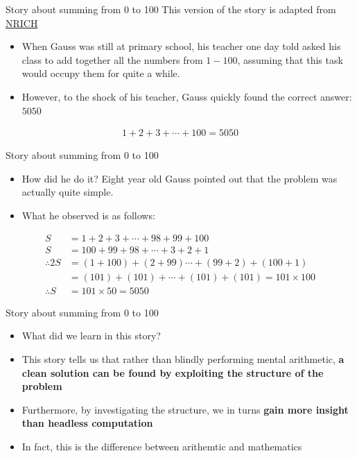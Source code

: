 \documentclass[10pt,xcolor={table,dvipsnames},t]{beamer}
\begin{document}
\begin{frame}{Story about summing from 0 to 100}
  This version of the story is adapted from \href{https://nrich.maths.org/2478}{NRICH}
  \begin{itemize}
    \item When Gauss was still at primary school, his teacher one day told asked his class to add together all the numbers from $1-100$, assuming that this task would occupy them for quite a while. 
    \item However, to the shock of his teacher, Gauss quickly found the correct answer: $5050$
  \end{itemize}
  \begin{align*}
    1 + 2 + 3 + \cdots + 100 = 5050 
  \end{align*}
\end{frame}

\begin{frame}{Story about summing from 0 to 100}
  \begin{itemize}
    \item How did he do it? Eight year old Gauss pointed out that the problem was actually quite simple.
    \item What he observed is as follows:
  \end{itemize}
  \begin{align*}
    S &= 1 + 2 + 3 + \cdots + 98 + 99 + 100\\
    S &= 100 + 99 + 98 + \cdots + 3 + 2 + 1\\
    \therefore 2S &= (1+100) + (2+99) \cdots+ (99+2) + (100+1)\\
    &= (101) + (101) + \cdots + (101) + (101) = 101\times 100\\
   \therefore S & = 101 \times 50 = 5050
  \end{align*}
\end{frame}

\begin{frame}{Story about summing from 0 to 100}
  \begin{itemize}
    \item What did we learn in this story?
    \item This story tells us that rather than blindly performing mental arithmetic, \textbf{a clean solution can be found by exploiting the structure of the problem}
    \item Furthermore, by investigating the structure, we in turns \textbf{gain more insight than headless computation}
    \item In fact, this is the difference between arithemtic and mathematics
  \end{itemize}
\end{frame}
\end{document}
